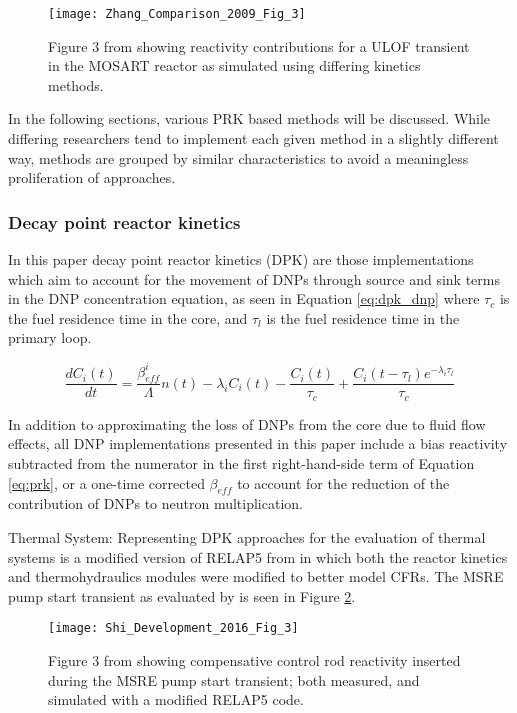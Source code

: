 \documentclass[review]{elsarticle}
\begin{document}
\begin{figure}[H]
   \centering
   \texttt{[image: Zhang\_Comparison\_2009\_Fig\_3]}
   \caption{Figure 3 from \cite{zhang_comparison_2009} showing reactivity contributions for a
   ULOF transient in the MOSART reactor as simulated using differing kinetics methods.} 
   \label{fig:zhang_prk_reac}
\end{figure}

In the following
sections, various PRK based methods will be discussed. 
 While differing researchers
tend to implement each given method in a slightly different way, methods are
grouped by similar characteristics to avoid a meaningless proliferation of
approaches.

\subsubsection{Decay point reactor kinetics} \label{sssec:dpk}
In this paper
decay point reactor kinetics (DPK) are those implementations
which aim to account for the movement of DNPs through source and sink terms
in the DNP concentration equation, as seen in Equation \ref{eq:dpk_dnp}
where $\tau_{c}$ is the fuel residence time in the core, and $\tau_{l}$ is the
fuel residence time in the primary loop.

\begin{equation}
    \label{eq:dpk_dnp}
    \frac{dC_{i}(t)}{dt} = \frac{\beta_{eff}^{i}}{\Lambda} n(t) -
        \lambda_{i} C_{i}(t) - \frac{C_{i}(t)}{\tau_{c}} +
        \frac{C_{i}(t - \tau_{l}) e^{-\lambda_{i} \tau_{l}}}{\tau_{c}}
\end{equation}

In addition to approximating the loss of DNPs from the core due to fluid
flow effects, all DNP implementations presented in this paper include
a bias reactivity subtracted from the numerator in the first right-hand-side
term of Equation \ref{eq:prk}, or a one-time corrected $\beta_{eff}$ to account
for the reduction of the contribution of DNPs to neutron multiplication.

\par Thermal System: Representing DPK approaches for the evaluation of thermal
systems is a modified version of RELAP5 from \cite{shi_development_2016} in
which both the reactor kinetics and thermohydraulics modules were modified
to better model CFRs. The MSRE pump start transient as evaluated by
\cite{shi_development_2016} is seen in Figure \ref{fig:shi_msre_ps}.

\begin{figure}[H]
   \centering
   \texttt{[image: Shi\_Development\_2016\_Fig\_3]}
   \caption{Figure 3 from \cite{shi_development_2016} showing 
    compensative control rod reactivity inserted during the MSRE pump start
   transient; both measured, and simulated with a modified RELAP5 code.} 
   \label{fig:shi_msre_ps}
\end{figure}
\end{document}
